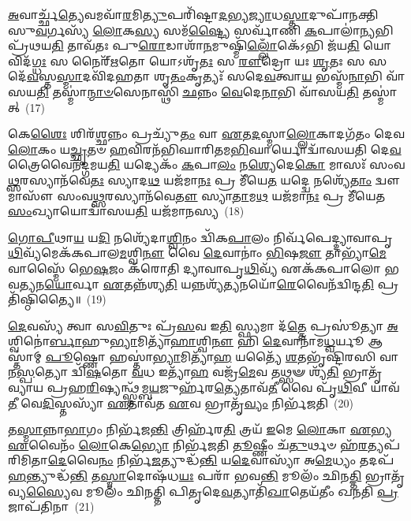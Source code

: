 \-\ul{𑌅}\-𑌵𑌾𑌰𑍍𑌚𑍍𑌛᳴\-\ul{𑌤𑍍𑌯𑍇}\-𑌵𑌮𑌵𑌾᳴\-\ul{𑌰}\-𑌮𑌿\-\ul{𑌤𑍍𑌯𑍁}\-𑌪𑌰𑌿᳴𑌷𑍍𑌟𑌾\-\ul{𑌦}\-𑌭𑍍𑌯\-\ul{𑌜𑍍𑌯𑌾}\-𑌧\-\ul{𑌸𑍍𑌤𑌾}\-𑌦𑍁𑌪𑌾᳴𑌨𑌕𑍍𑌤𑌿 𑌸𑍁\-\ul{𑌵}\-𑌰𑍍𑌗𑌸𑍍𑌯᳴ \ul{𑌲𑍋}\-𑌕\-\ul{𑌸𑍍𑌯} 𑌸𑌮᳴\-\ul{𑌷𑍍𑌟𑍍𑌯𑍈} 𑌸𑌰𑍍𑌵𑌾᳴𑌣𑌿 \ul{𑌕}\-𑌪𑌾𑌲𑌾॑\-\ul{𑌨𑍍𑌯}\-𑌭𑌿 𑌪𑍍𑌰᳴𑌥𑌯\-\ul{𑌤𑌿} 𑌤𑌾𑌵᳴𑌤𑌃 𑌪𑍁\-\ul{𑌰𑍋}\-𑌡𑌾𑌶𑌾᳴\-\ul{𑌨}\-𑌮𑍁𑌷𑍍𑌮𑌿᳴\-\ul{𑌲𑍍𑌲𑍋𑌁}\-𑌕𑍇᳴\-𑌽𑌭𑌿 𑌜᳴𑌯\-\ul{𑌤𑌿} 𑌯𑍋 𑌵𑌿𑌦᳴\-\ul{𑌗𑍍𑌧𑌃} 𑌸 𑌨𑍈𑌰𑍍\mbox{}᳴\-\ul{𑌋}\-𑌤𑍋 𑌯𑍋\-𑌽𑌶𑍃᳴\-\ul{𑌤𑌃} 𑌸 \ul{𑌰𑍗}\-𑌦𑍍𑌰𑍋 𑌯𑌃 \ul{𑌶𑍃}\-𑌤𑌃 𑌸 𑌸𑌦𑍇᳴\-\ul{𑌵}\-𑌸𑍍𑌤\-\ul{𑌸𑍍𑌮𑌾}\-𑌦𑌵𑌿᳴𑌦𑌹𑌤𑌾 𑌶𑍃\-\ul{𑌤𑌂}\-𑌕𑍃𑌤𑍍𑌯𑌃᳴ 𑌸𑌦𑍇\-\ul{𑌵}\-𑌤𑍍𑌵𑌾\-\ul{𑌯} 𑌭𑌸𑍍𑌮᳴\-\ul{𑌨𑌾}\-𑌭𑌿 𑌵𑌾᳴𑌸𑌯\-\ul{𑌤𑌿} 𑌤𑌸𑍍𑌮𑌾॑\-\ul{𑌨𑍍𑌮𑌾}\-\-\ul{𑍞}\-𑌸𑍇𑌨𑌾𑌸𑍍𑌥𑌿᳴ \ul{𑌛}\-𑌨𑍍𑌨𑌂 \ul{𑌵𑍇}\-𑌦𑍇\-\ul{𑌨𑌾}\-𑌭𑌿 𑌵𑌾᳴𑌸𑌯\-\ul{𑌤𑌿} 𑌤𑌸𑍍𑌮𑌾॑𑌤𑍍~(17)

𑌕𑍇\-\ul{𑌶𑍈𑌃} 𑌶𑌿𑌰᳴\-\ul{𑌶𑍍𑌛}\-𑌨𑍍𑌨𑌂 𑌪𑍍𑌰𑌚𑍍𑌯𑍁᳴\-\ul{𑌤𑌂} 𑌵𑌾 \ul{𑌏}\-𑌤\-\ul{𑌦}\-𑌸𑍍𑌮𑌾\-\ul{𑌲𑍍𑌲𑍋}\-𑌕𑌾𑌦𑌗᳴𑌤𑌂 𑌦𑍇𑌵\-\ul{𑌲𑍋}\-𑌕𑌂 𑌯\-\ul{𑌚𑍍𑌛𑍃}\-𑌤𑍞 \ul{𑌹}\-𑌵𑌿𑌰𑌨᳴𑌭𑌿𑌘𑌾𑌰𑌿𑌤𑌮\-\ul{𑌭𑌿}\-𑌘𑌾𑌰𑍍𑌯𑍋𑌦𑍍𑌵𑌾᳴𑌸𑌯𑌤𑌿 𑌦𑍇\-\ul{𑌵}\-𑌤𑍍𑌰𑍈𑌵𑍈𑌨᳴𑌦𑍍𑌗𑌮𑌯\-\ul{𑌤𑌿} 𑌯𑌦𑍍𑌯𑍇𑌕𑌂᳴ \ul{𑌕}\-𑌪𑌾\-\ul{𑌲𑌂} 𑌨\-\ul{𑌶𑍍𑌯𑍇}\-𑌦𑍇\-\ul{𑌕𑍋} 𑌮𑌾𑌸𑌃᳴ 𑌸𑌂𑌵\-\ul{𑌥𑍍𑌸}\-𑌰𑌸𑍍𑌯𑌾𑌨᳴𑌵𑍇\-\ul{𑌤𑌃} 𑌸𑍍𑌯𑌾𑌦\-\ul{𑌥} 𑌯𑌜᳴𑌮𑌾\-\ul{𑌨𑌃} 𑌪𑍍𑌰 𑌮𑍀᳴𑌯𑍇\-\ul{𑌤} 𑌯𑌦𑍍𑌦𑍍𑌵𑍇 𑌨𑌶𑍍𑌯𑍇᳴\-\ul{𑌤𑌾𑌂} 𑌦𑍍𑌵𑍗 𑌮𑌾𑌸𑍗᳴ 𑌸𑌂𑌵\-\ul{𑌥𑍍𑌸}\-𑌰𑌸𑍍𑌯𑌾𑌨᳴𑌵𑍇\-\ul{𑌤𑍗} 𑌸𑍍𑌯𑌾\-\ul{𑌤𑌾}\-𑌮\-\ul{𑌥} 𑌯𑌜᳴𑌮𑌾\-\ul{𑌨𑌃} 𑌪𑍍𑌰 𑌮𑍀᳴𑌯𑍇𑌤 \ul{𑌸𑌂}\-𑌖𑍍𑌯𑌾𑌯𑍋𑌦𑍍𑌵𑌾᳴𑌸𑌯\-\ul{𑌤𑌿} 𑌯𑌜᳴𑌮𑌾𑌨𑌸𑍍𑌯~(18)

\-\ul{𑌗𑍋}\-\-\ul{𑌪𑍀}\-𑌥𑌾\-\ul{𑌯} 𑌯\-\ul{𑌦𑌿} 𑌨𑌶𑍍𑌯𑍇᳴𑌦𑌾\-\ul{𑌶𑍍𑌵𑌿}\-𑌨𑌂 𑌦𑍍𑌵𑌿᳴𑌕\-\ul{𑌪𑌾}\-𑌲𑌂 𑌨𑌿𑌰𑍍𑌵᳴𑌪𑍇𑌦𑍍𑌦𑍍𑌯𑌾𑌵𑌾𑌪𑍃\-\ul{𑌥𑌿}\-𑌵𑍍𑌯᳴𑌮𑍇𑌕᳴𑌕𑌪𑌾𑌲\-\ul{𑌮}\-𑌶𑍍𑌵𑌿\-\ul{𑌨𑍗} 𑌵𑍈 \ul{𑌦𑍇}\-𑌵𑌾𑌨𑌾𑌂॑ \ul{𑌭𑌿}\-𑌷\-\ul{𑌜𑍗} 𑌤𑌾𑌭𑍍𑌯𑌾᳴\-\ul{𑌮𑍇}\-𑌵𑌾𑌸𑍍𑌮𑍈᳴ 𑌭𑍇\-\ul{𑌷}\-𑌜𑌂 𑌕᳴𑌰𑍋𑌤𑌿 𑌦𑍍𑌯𑌾𑌵𑌾𑌪𑍃\-\ul{𑌥𑌿}\-𑌵𑍍𑌯᳴ 𑌏𑌕᳴𑌕𑌪𑌾𑌲𑍋 𑌭𑌵\-\ul{𑌤𑍍𑌯}\-𑌨\-\ul{𑌯𑍋}\-𑌰𑍍𑌵𑌾 \ul{𑌏}\-𑌤𑌨𑍍𑌨᳴𑌶𑍍𑌯\-\ul{𑌤𑌿} 𑌯𑌨𑍍𑌨𑌶𑍍𑌯᳴\-\ul{𑌤𑍍𑌯}\-𑌨𑌯𑍋᳴\-\ul{𑌰𑍇}\-𑌵𑍈𑌨᳴𑌦𑍍𑌵𑌿𑌨𑍍𑌦\-\ul{𑌤𑌿} 𑌪𑍍𑌰𑌤𑌿᳴𑌷𑍍𑌠𑌿𑌤𑍍𑌯𑍈॥~(19)

{\anuvakamend[{\-\ul{𑌪𑍍𑌰𑌾}\-\-\ul{𑌜𑌾}\-\-\ul{𑌪}\-𑌤𑍍𑌯𑌨𑍍𑌤𑍇\-𑌽𑌕𑍍𑌷𑍋\-𑌽𑌨𑍁᳴𑌪𑌾𑌕𑍍𑌤𑍋 \ul{𑌵𑍇}\-𑌦𑍇\-\ul{𑌨𑌾}\-𑌭𑌿 𑌵𑌾᳴𑌸𑌯\-\ul{𑌤𑌿} 𑌤\-\ul{𑌸𑍍𑌮𑌾}\-𑌦𑍍𑌯𑌜᳴𑌮𑌾𑌨\-\ul{𑌸𑍍𑌯} 𑌦𑍍𑌵𑌾𑌤𑍍𑌰𑌿𑍞᳴𑌶𑌚𑍍𑌚}]}%

\-\ul{𑌦𑍇}\-𑌵𑌸𑍍𑌯᳴ 𑌤𑍍𑌵𑌾 𑌸\-\ul{𑌵𑌿}\-𑌤𑍁𑌃 𑌪𑍍𑌰᳴\-\ul{𑌸}\-𑌵 𑌇\-\ul{𑌤𑌿} 𑌸𑍍𑌫𑍍𑌯𑌮𑌾 𑌦᳴\-\ul{𑌤𑍍𑌤𑍇} 𑌪𑍍𑌰𑌸𑍂॑𑌤𑍍𑌯𑌾 \ul{𑌅}\-𑌶𑍍𑌵𑌿𑌨𑍋॑\-\ul{𑌰𑍍𑌬𑌾}\-𑌹𑍁\-\ul{𑌭𑍍𑌯𑌾}\-𑌮𑌿𑌤𑍍𑌯𑌾᳴\-\ul{𑌹𑌾}\-𑌶𑍍𑌵𑌿\-\ul{𑌨𑍗} 𑌹𑌿 \ul{𑌦𑍇}\-𑌵𑌾𑌨𑌾᳴𑌮\-\ul{𑌧𑍍𑌵}\-𑌰𑍍𑌯𑍂 𑌆𑌸𑍍𑌤𑌾॑𑌮𑍍 \ul{𑌪𑍂}\-𑌷𑍍𑌣𑍋 𑌹𑌸𑍍𑌤𑌾॑\-\ul{𑌭𑍍𑌯𑌾}\-𑌮𑌿𑌤𑍍𑌯𑌾᳴\-\ul{𑌹} 𑌯𑌤𑍍𑌯𑍈᳴ \ul{𑌶}\-𑌤𑌭𑍃᳴𑌷𑍍𑌟𑌿𑌰𑌸𑌿 𑌵𑌾𑌨\-\ul{𑌸𑍍𑌪}\-𑌤𑍍𑌯𑍋 𑌦𑍍𑌵𑌿᳴\-\ul{𑌷}\-𑌤𑍋 \ul{𑌵}\-𑌧 𑌇𑌤𑍍𑌯𑌾᳴\-\ul{𑌹} 𑌵𑌜𑍍𑌰᳴\-\ul{𑌮𑍇}\-𑌵 𑌤𑌥𑍍𑌸𑍟 𑌶𑍍𑌯᳴\-\ul{𑌤𑌿} 𑌭𑍍𑌰𑌾𑌤𑍃᳴𑌵𑍍𑌯𑌾𑌯 𑌪𑍍𑌰𑌹\-\ul{𑌰𑌿}\-𑌷𑍍𑌯𑌨𑍍𑌥𑍍𑌸𑍍𑌤᳴𑌮𑍍𑌬\-\ul{𑌯}\-𑌜𑍁𑌰𑍍\mbox{}𑌹᳴𑌰\-\ul{𑌤𑍍𑌯𑍇}\-𑌤𑌾𑌵᳴\-\ul{𑌤𑍀} 𑌵𑍈 𑌪𑍃᳴\-\ul{𑌥𑌿}\-𑌵𑍀 𑌯𑌾𑌵᳴\-\ul{𑌤𑍀} 𑌵𑍇\-\ul{𑌦𑌿}\-𑌸𑍍𑌤𑌸𑍍𑌯𑌾᳴ \ul{𑌏}\-𑌤𑌾𑌵᳴𑌤 \ul{𑌏}\-𑌵 𑌭𑍍𑌰𑌾𑌤𑍃᳴\-\ul{𑌵𑍍𑌯𑌂} 𑌨𑌿𑌰𑍍𑌭᳴𑌜𑌤𑌿~(20)

𑌤\-\ul{𑌸𑍍𑌮𑌾}\-𑌨𑍍𑌨𑌾\-\ul{𑌭𑌾}\-𑌗𑌂 𑌨𑌿𑌰𑍍𑌭᳴𑌜\-\ul{𑌨𑍍𑌤𑌿} 𑌤𑍍𑌰𑌿𑌰𑍍\mbox{}𑌹᳴𑌰\-\ul{𑌤𑌿} 𑌤𑍍𑌰𑌯᳴ \ul{𑌇}\-𑌮𑍇 \ul{𑌲𑍋}\-𑌕𑌾 \ul{𑌏}\-𑌭𑍍𑌯 \ul{𑌏}\-𑌵𑍈𑌨𑌂᳴ \ul{𑌲𑍋}\-𑌕𑍇\-\ul{𑌭𑍍𑌯𑍋} 𑌨𑌿𑌰𑍍𑌭᳴𑌜𑌤𑌿 \ul{𑌤𑍂}\-𑌷𑍍𑌣𑍀𑌂 𑌚᳴\-\ul{𑌤𑍁}\-𑌰𑍍𑌥𑍞 𑌹᳴\-\ul{𑌰}\-𑌤𑍍𑌯𑌪᳴𑌰𑌿𑌮𑌿𑌤𑌾\-\ul{𑌦𑍇}\-𑌵𑍈\-\ul{𑌨𑌂} 𑌨𑌿𑌰𑍍𑌭᳴\-\ul{𑌜}\-𑌤𑍍𑌯𑍁𑌦𑍍𑌧᳴\-\ul{𑌨𑍍𑌤𑌿} 𑌯\-\ul{𑌦𑍇}\-𑌵𑌾𑌸𑍍𑌯𑌾᳴ 𑌅\-\ul{𑌮𑍇}\-𑌧𑍍𑌯𑌂 𑌤𑌦𑌪᳴ \ul{𑌹}\-𑌨𑍍𑌤𑍍𑌯𑍁𑌦𑍍𑌧᳴\-\ul{𑌨𑍍𑌤𑌿} 𑌤\-\ul{𑌸𑍍𑌮𑌾}\-𑌦𑍋𑌷᳴𑌧\-\ul{𑌯𑌃} 𑌪𑌰𑌾᳴ 𑌭𑌵\-\ul{𑌨𑍍𑌤𑌿} 𑌮𑍂𑌲𑌂᳴ 𑌛𑌿𑌨\-\ul{𑌤𑍍𑌤𑌿} 𑌭𑍍𑌰𑌾𑌤𑍃᳴𑌵𑍍𑌯\-\ul{𑌸𑍍𑌯𑍈}\-𑌵 𑌮𑍂𑌲𑌂᳴ 𑌛𑌿𑌨𑌤𑍍𑌤𑌿 𑌪𑌿𑌤𑍃𑌦𑍇\-\ul{𑌵}\-𑌤𑍍𑌯𑌾𑌤𑌿᳴\-\ul{𑌖𑌾}\-𑌤𑍇𑌯᳴𑌤𑍀𑌂 𑌖𑌨𑌤𑌿 \ul{𑌪𑍍𑌰}\-𑌜𑌾𑌪᳴𑌤𑌿𑌨𑌾~(21)

